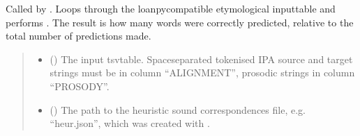 \documentclass[letterpaper,10pt,english]{sphinxmanual}
\begin{document}

\begin{fulllineitems}
\label{\detokenize{documentation:loanpy.eval_sca.eval_one}}
\pysigstartsignatures
{}
\pysigstopsignatures
\sphinxAtStartPar
Called by .
Loops through the loanpy\sphinxhyphen{}compatible etymological input\sphinxhyphen{}table and
performs .
The result is how many words were correctly predicted, relative to the
total number of predictions made.
\begin{quote}\begin{description}
\begin{itemize}
\item {} 
\sphinxAtStartPar
{} () \textendash{} The input tsv\sphinxhyphen{}table. Space\sphinxhyphen{}separated tokenised IPA source
and target strings must be in column “ALIGNMENT”, prosodic
strings in column “PROSODY”.

\item {} 
\sphinxAtStartPar
{} (\sphinxstyleliteralemphasis{\sphinxupquote{, }}) \textendash{} The path to the heuristic sound correspondences file,
e.g. “heur.json”, which was created with
.


\end{itemize}
\end{description}
\end{quote}
\end{fulllineitems}
\end{document}
